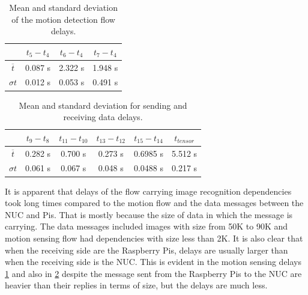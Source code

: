 \begin{table}[H]
\centering
\begin{tabular}{c|c|c|c}\toprule
&$t_5 - t_4$  & $t_6 - t_4$  & $t_7-t_4$ \\ \midrule
$ \overline{t} $ &0.087 s&2.322 s&1.948 s\\
$ \sigma t $&0.012 s&0.053 s&0.491 s\\
\end{tabular}
\caption{Mean and standard deviation of the motion detection flow delays.}
\label{table:motion}
\end{table}

\begin{table}[H]
\centering
\begin{tabular}{c|c|c|c|c|c}	\toprule
&$t_9 - t_8$  & $t_{11} - t_{10}$  & $t_{13}-t_{12}$ & $t_{15}-t_{14}$&  $t_{tensor}$ \\ \midrule
$ \overline{t} $&0.282 s&0.700 s&	0.273 s&0.6985 s&5.512 s\\
$ \sigma t $&0.061 s&0.067 s&	0.048 s&0.0488 s&0.217 s\\
	\end{tabular}
	\caption{Mean and standard deviation for sending and receiving data delays.}
	\label{table:data}
\end{table}

\noindent It is apparent that delays of the flow carrying image recognition dependencies took long times compared to the motion flow and the data messages between the NUC and Pis. That is mostly because the size of data in which the message is carrying. The data messages included images with size from 50K to 90K  and motion sensing flow had dependencies with size less than 2K. It is also clear that when the receiving side are the Raspberry Pis, delays are usually larger than when the receiving side is the NUC. This is evident in the motion sensing delays \ref{table:motion} and  also in \ref{table:data} despite the message sent from the Raspberry Pis to the NUC are heavier than their replies  in terms of size, but the delays are much less.

